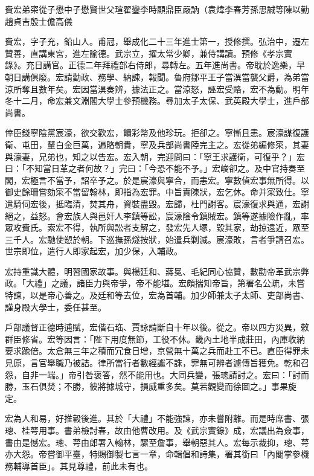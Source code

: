 
\begin{pinyinscope}
費宏弟寀從子懋中子懋賢世父瑄翟鑾李時顧鼎臣嚴訥（袁煒李春芳孫思誠等陳以勤趙貞吉殷士儋高儀

費宏，字子充，鉛山人。甫冠，舉成化二十三年進士第一，授修撰。弘治中，遷左贊善，直講東宮，進左諭德。武宗立，擢太常少卿，兼侍講讀。預修《孝宗實錄》。充日講官。正德二年拜禮部右侍郎，尋轉左。五年進尚書。帝耽於逸樂，早朝日講俱廢。宏請勤政、務學、納諫，報聞。魯府鄒平王子當潩當襲父爵，為弟當涼所奪且數年矣。宏因當潩奏辨，據法正之。當涼怒，誣宏受賂，宏不為動。明年冬十二月，命宏兼文淵閣大學士參預機務。尋加太子太保、武英殿大學士，進戶部尚書。

倖臣錢寧陰黨宸濠，欲交歡宏，饋彩幣及他珍玩。拒卻之。寧慚且恚。宸濠謀復護衛、屯田，輦白金巨萬，遍賂朝貴，寧及兵部尚書陸完主之。宏從弟編修寀，其妻與濠妻，兄弟也，知之以告宏。宏入朝，完迎問曰：「寧王求護衛，可復乎？」宏曰：「不知當日革之者何故？」完曰：「今恐不能不予。」宏峻卻之。及中官持奏至閣，宏極言不當予，詔卒予之。於是宸濠與寧合，而恚宏。寧數偵宏事無所得。以御史餘珊嘗劾寀不當留翰林，即指為宏罪。中旨責陳狀，宏乞休。命并寀致仕。寧遣騎伺宏後，抵臨清，焚其舟，資裝盡毀。宏歸，杜門謝客。宸濠復求與通，宏謝絕之，益怒。會宏族人與邑奸人李鎮等訟，宸濠陰令鎮賊宏。鎮等遂據險作亂，率眾攻費氏。索宏不得，執所與訟者支解之，發宏先人塚，毀其家，劫掠遠近，眾至三千人。宏馳使愬於朝。下巡撫孫燧按狀，始遣兵剿滅。宸濠敗，言者爭請召宏。世宗即位，遣行人即家起宏，加少保，入輔政。

宏持重識大體，明習國家故事。與楊廷和、蔣冕、毛紀同心協贊，數勸帝革武宗弊政。「大禮」之議，諸臣力與帝爭，帝不能堪。宏頗揣知帝旨，第署名公疏，未嘗特諫，以是帝心善之。及廷和等去位，宏為首輔。加少師兼太子太師、吏部尚書、謹身殿大學士，委任甚至。

戶部議督正德時逋賦，宏偕石珤、賈詠請斷自十年以後。從之。帝以四方災異，敕群臣修省。宏等因言：「陛下用度無節，工役不休。畿內土地半成莊田，內庫收納要求踰倍。太倉無三年之積而冗食日增，京營無十萬之兵而赴工不已。直臣得罪未見原，言官舉職乃被詰。律所當行者數經讞不誅，罪無可辨者遽傳旨獲免。乾和召怨，自非一端。」帝引咎褒答，然不能用也。大同兵變，張璁請討之。宏曰：「討而勝，玉石俱焚；不勝，彼將據城守，損威重多矣。莫若觀變而徐圖之。」事果旋定。

宏為人和易，好推轂後進。其於「大禮」不能強諫，亦未嘗附離。而是時席書、張璁、桂萼用事。書弟檢討春，故由他曹改用。及《武宗實錄》成，宏議出為僉事，書由是憾宏。璁、萼由郎署入翰林，驟至詹事，舉朝惡其人。宏每示裁抑，璁、萼亦大怨。帝嘗御平臺，特賜御製七言一章，命輯倡和詩集，署其銜曰「內閣掌參機務輔導首臣」。其見尊禮，前此未有也。


\end{pinyinscope}
